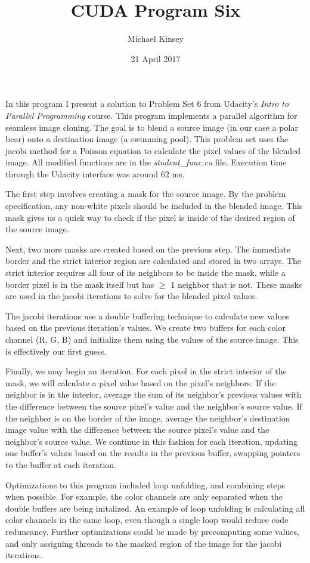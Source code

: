 \documentclass{article}
\begin{document}
\title{CUDA Program Six}
\author{Michael Kinsey}
\date{21 April 2017}
\maketitle

In this program I present a solution to Problem Set 6 from Udacity's \textit{Intro
to Parallel Programming} course. This program implements a parallel algorithm for
seamless image cloning. The goal is to blend a source image (in our case a polar bear) 
onto a destination image (a swimming pool). This problem set uses the jacobi method 
for a Poisson equation to calculate the pixel values of the blended image.  All 
modified functions are in the \textit{student\_func.cu} file. Execution time 
through the Udacity interface was around 62 ms.

The first step involves creating a mask for the source image. By the problem 
specification, any non-white pixels should be included in the blended image.
This mask gives us a quick way to check if the pixel is inside of the desired
region of the source image.

Next, two more masks are created based on the previous step. The immediate 
border and the strict interior region are calculated and stored in two arrays. 
The strict interior requires all four of its neighbors to be inside the mask, 
while a border pixel is in the mask itself but has $\geq$ 1 neighbor that is not.
These masks are used in the jacobi iterations to solve for the blended pixel 
values.

The jacobi iterations use a double buffering technique to calculate new values
based on the previous iteration's values. We create two buffers for each color
channel (R, G, B) and initialize them using the values of the source image. This
is effectively our first guess. 

Finally, we may begin an iteration. For each pixel in the strict interior of 
the mask, we will calculate a pixel value based on the pixel's neighbors. If 
the neighbor is in the interior, average the sum of its neighbor's previous 
values with the difference between the source pixel's value and the neighbor's 
source value. If the neighbor is on the border of the image, average the 
neighbor's destination image value with the difference between the source pixel's
value and the neighbor's source value. We continue in this fashion for each 
iteration, updating one buffer's values based on the results in the previous 
buffer, swapping pointers to the buffer at each iteration.

Optimizations to this program included loop unfolding, and combining steps when
possible. For example, the color channels are only separated when the double 
buffers are being initalized. An example of loop unfolding is calculating 
all color channels in the same loop, even though a single loop would reduce
code reduncancy. Further optimizations could be made by precomputing some values,
and only assigning threads to the masked region of the image for the jacobi 
iterations.
\end{document}
